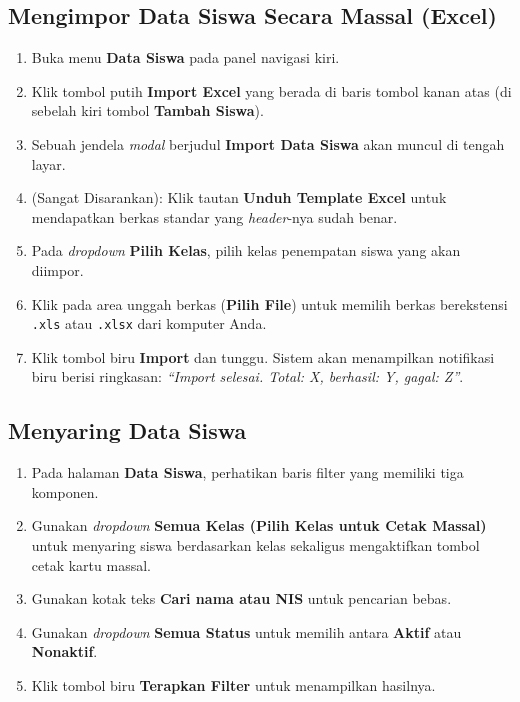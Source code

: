 \subsection{Mengimpor Data Siswa Secara Massal (Excel)}
\begin{enumerate}
    \item Buka menu \textbf{Data Siswa} pada panel navigasi kiri.
    \item Klik tombol putih \textbf{Import Excel} yang berada di baris tombol kanan atas (di sebelah kiri tombol \textbf{Tambah Siswa}).
    \item Sebuah jendela \textit{modal} berjudul \textbf{Import Data Siswa} akan muncul di tengah layar.
    \item (Sangat Disarankan): Klik tautan \textbf{Unduh Template Excel} untuk mendapatkan berkas standar yang \textit{header}-nya sudah benar.
    \item Pada \textit{dropdown} \textbf{Pilih Kelas}, pilih kelas penempatan siswa yang akan diimpor.
    \item Klik pada area unggah berkas (\textbf{Pilih File}) untuk memilih berkas berekstensi \texttt{.xls} atau \texttt{.xlsx} dari komputer Anda.
    \item Klik tombol biru \textbf{Import} dan tunggu. Sistem akan menampilkan notifikasi biru berisi ringkasan: \textit{``Import selesai. Total: X, berhasil: Y, gagal: Z''}.
\end{enumerate}

\subsection{Menyaring Data Siswa}
\begin{enumerate}
    \item Pada halaman \textbf{Data Siswa}, perhatikan baris filter yang memiliki tiga komponen.
    \item Gunakan \textit{dropdown} \textbf{Semua Kelas (Pilih Kelas untuk Cetak Massal)} untuk menyaring siswa berdasarkan kelas sekaligus mengaktifkan tombol cetak kartu massal.
    \item Gunakan kotak teks \textbf{Cari nama atau NIS} untuk pencarian bebas.
    \item Gunakan \textit{dropdown} \textbf{Semua Status} untuk memilih antara \textbf{Aktif} atau \textbf{Nonaktif}.
    \item Klik tombol biru \textbf{Terapkan Filter} untuk menampilkan hasilnya.
\end{enumerate}

